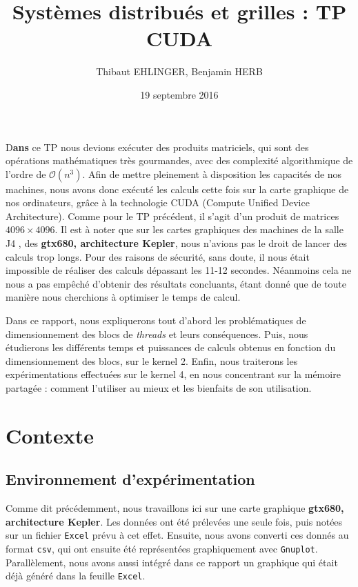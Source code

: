\documentclass[	DIV=calc,%
							paper=a4,%
							fontsize=11pt%
							]{scrartcl}	 					%
\title{Systèmes distribués et grilles : TP CUDA}					%
\author{Thibaut EHLINGER, Benjamin HERB }											%
\date{19 septembre 2016}
\newcommand{\initial}[1]{%
     \lettrine[lines=3,lhang=0.3,nindent=0em]{
     				\color{DarkGoldenrod}
     				{\textsf{#1}}}{}}
\begin{document}
\maketitle
\thispagestyle{fancy} 			%
\initial{D}\textbf{ans} ce TP nous devions exécuter des produits matriciels, qui sont des opérations mathématiques très gourmandes, avec des complexité algorithmique de l'ordre de $ \mathcal{O}(n^3)$. Afin de mettre pleinement à disposition les capacités de nos machines, nous avons donc exécuté les calculs cette fois sur la carte graphique de nos ordinateurs, grâce à la technologie CUDA (Compute Unified Device Architecture). Comme pour le TP précédent, il s'agit d'un produit de matrices $ 4096 \times 4096$. Il est à noter que sur les cartes graphiques des machines de la salle J4 , des \textbf{gtx680, architecture Kepler}, nous n'avions pas le droit de lancer des calculs trop longs. Pour des raisons de sécurité, sans doute, il nous était impossible de réaliser des calculs dépassant les 11-12 secondes. Néanmoins cela ne nous a pas empêché d'obtenir des résultats concluants, étant donné que de toute manière nous cherchions à optimiser le temps de calcul.\par
Dans ce rapport, nous expliquerons tout d'abord les problématiques de dimensionnement des blocs de \textit{threads} et leurs conséquences. Puis, nous étudierons les différents temps et puissances de calculs obtenus en fonction du dimensionnement des blocs, sur le kernel 2. Enfin, nous traiterons les expérimentations effectuées sur le kernel 4, en nous concentrant sur la mémoire partagée : comment l'utiliser au mieux et les bienfaits de son utilisation. 

\section{Contexte}
\subsection{Environnement d'expérimentation}
Comme dit précédemment, nous travaillons ici sur une carte graphique \textbf{gtx680, architecture Kepler}. Les données ont été prélevées une seule fois, puis notées sur un fichier \texttt{Excel} prévu à cet effet. Ensuite, nous avons converti ces donnés au format \texttt{csv}, qui ont ensuite été représentées graphiquement avec \texttt{Gnuplot}. Parallèlement, nous avons aussi intégré dans ce rapport un graphique qui était déjà généré dans la feuille \texttt{Excel}.
\end{document}
